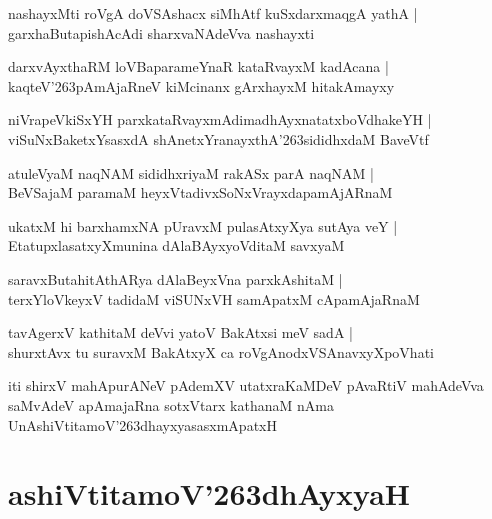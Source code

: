 \documentclass[twoside,12pt,openright]{book}
\def\S{\char'263}
\newcounter{shloka}[chapter]
\begin{document}
\begin{shloka}%
nashayxMti roVgA doVSAshacx siMhAtf kuSxdarxmaqgA yathA |\\
garxhaButapishAcAdi sharxvaNAdeVva nashayxti
\end{shloka}

\begin{shloka}%
darxvAyxthaRM loVBaparameYnaR kataRvayxM kadAcana |\\
kaqteV\S pAmAjaRneV kiMcinanx gArxhayxM hitakAmayxy
\end{shloka}

\begin{shloka}%
niVrapeVkiSxYH parxkataRvayxmAdimadhAyxnatatxboVdhakeYH |\\
viSuNxBaketxYsasxdA shAnetxYranayxthA\S sididhxdaM BaveVtf 
\end{shloka}

\begin{shloka}%
atuleVyaM naqNAM sididhxriyaM rakASx parA naqNAM |\\
BeVSajaM paramaM heyxVtadivxSoNxVrayxdapamAjARnaM 
\end{shloka}

\begin{shloka}%
ukatxM hi barxhamxNA pUravxM pulasAtxyXya sutAya veY |\\
EtatupxlasatxyXmunina dAlaBAyxyoVditaM savxyaM 
\end{shloka}

\begin{shloka}%
saravxButahitAthARya dAlaBeyxVna parxkAshitaM |\\
terxYloVkeyxV tadidaM viSUNxVH samApatxM cApamAjaRnaM 
\end{shloka}

\begin{shloka}%
tavAgerxV kathitaM deVvi yatoV BakAtxsi meV sadA |\\
shurxtAvx tu suravxM BakAtxyX ca roVgAnodxVSAnavxyXpoVhati
\end{shloka}

\begin{center}
iti shirxV mahApurANeV pAdemXV utatxraKaMDeV pAvaRtiV mahAdeVva saMvAdeV apAmajaRna sotxVtarx 
kathanaM nAma UnAshiVtitamoV\S dhayxyasasxmApatxH 
\end{center}

\chapter{ashiVtitamoV\S dhAyxyaH}
\end{document}
